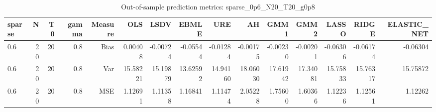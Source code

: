 \begin{table}[!htbp]\centering
\caption{Out-of-sample prediction metrics: sparse_0p6_N20_T20_g0p8}
\label{tab:table3_sparse_0p6_N20_T20_g0p8}
\begin{tabular}{lrrrrrrrrrrrrrr}
\hline
sparse & N & T0 & gamma & Measure & OLS & LSDV & EBMLE & URE & AH & GMM1 & GMM2 & LASSO & RIDGE & ELASTIC_NET \\
\hline
0.6 & 20 & 20 & 0.8 & Bias & 0.00408 & -0.00724 & -0.05544 & -0.01284 & -0.00175 & -0.00230 & -0.00201 & -0.06306 & -0.06174 & -0.06304 \\
0.6 & 20 & 20 & 0.8 & Var & 15.58221 & 15.19879 & 13.62592 & 14.94160 & 18.06030 & 17.61942 & 17.34081 & 15.75833 & 15.76317 & 15.75872 \\
0.6 & 20 & 20 & 0.8 & MSE & 1.12691 & 1.11358 & 1.16841 & 1.11474 & 2.05228 & 1.75600 & 1.60366 & 1.12236 & 1.12561 & 1.12262 \\
\hline
\end{tabular}
\end{table}

